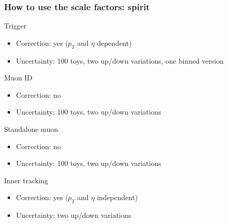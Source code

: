 \documentclass[10pt]{beamer}
\begin{document}
 \begin{frame}
  \frametitle{How to use the scale factors: spirit}
  
  
  \begin{block}{Trigger}
   \begin{itemize}
    \item Correction: yes ($p_{T}$ and $\eta$ dependent)
    \item Uncertainty: 100 toys, two up/down variations, one binned version
   \end{itemize}
  \end{block}
  
  \begin{block}{Muon ID}
   \begin{itemize}
    \item Correction: no
    \item Uncertainty: 100 toys, two up/down variations
   \end{itemize}
  \end{block}

  \begin{block}{Standalone muon}
   \begin{itemize}
    \item Correction: no
    \item Uncertainty: 100 toys, two up/down variations
   \end{itemize}
  \end{block}
  
  \begin{block}{Inner tracking}
   \begin{itemize}
    \item Correction: yes ($p_{T}$ and $\eta$ independent)
    \item Uncertainty: two up/down variations
   \end{itemize}
  \end{block}

 \end{frame}
 
\end{document}
